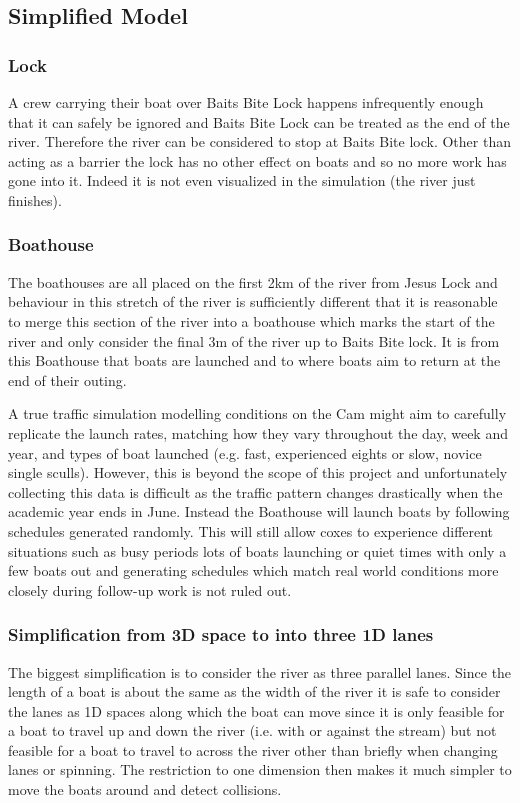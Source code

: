       \subsection{Simplified Model}
      
      \subsubsection{Lock}
      A crew carrying their boat over Baits Bite Lock happens infrequently enough that it can safely be ignored and Baits Bite Lock can be treated as the end of the river. Therefore the river can be considered to stop at Baits Bite lock. Other than acting as a barrier the lock has no other effect on boats and so no more work has gone into it. Indeed it is not even visualized in the simulation (the river just finishes).
      
      \subsubsection{Boathouse}
      The boathouses are all placed on the first 2km of the river from Jesus Lock and behaviour in this stretch of the river is sufficiently different that it is reasonable to merge this section of the river into a boathouse which marks the start of the river and only consider the final 3m of the river up to Baits Bite lock. It is from this Boathouse that boats are launched and to where boats aim to return at the end of their outing.
      
      A true traffic simulation modelling conditions on the Cam might aim to carefully replicate the launch rates, matching how they vary throughout the day, week and year, and types of boat launched (e.g. fast, experienced eights or slow, novice single sculls). However, this is beyond the scope of this project and unfortunately collecting this data is difficult as the traffic pattern changes drastically when the academic year ends in June. Instead the Boathouse will launch boats by following schedules generated randomly. This will still allow coxes to experience different situations such as busy periods lots of boats launching or quiet times with only a few boats out and generating schedules which match real world conditions more closely during follow-up work is not ruled out.
      
      \subsubsection{Simplification from 3D space to into three 1D lanes}
      The biggest simplification is to consider the river as three parallel lanes. Since the length of a boat is about the same as the width of the river it is safe to consider the lanes as 1D spaces along which the boat can move since it is only feasible for a boat to travel up and down the river (i.e. with or against the stream) but not feasible for a boat to travel to across the river other than briefly when changing lanes or spinning. The restriction to one dimension then makes it much simpler to move the boats around and detect collisions.
      
